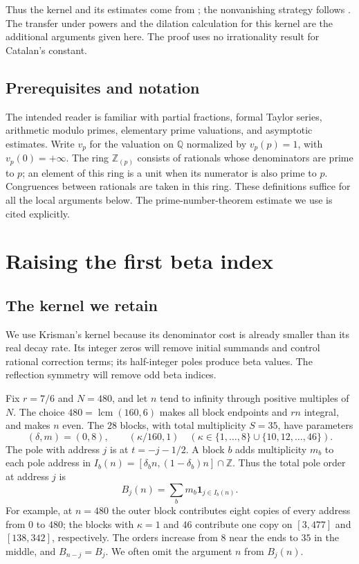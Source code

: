 \documentclass[11pt]{article}
\newcommand{\Z}{\mathbb Z}\newcommand{\Q}{\mathbb Q}
\newcommand{\ind}{\mathbf 1}
\begin{document}
Thus the kernel and its estimates come from \cite[Sections 2--6]{krisman};
the nonvanishing strategy follows \cite[Section 6]{shifted}. The transfer
under powers and the dilation calculation for this kernel are the
additional arguments given here. The proof uses no irrationality result
for Catalan's constant.

\subsection*{Prerequisites and notation}
The intended reader is familiar with partial fractions, formal Taylor
series, arithmetic modulo primes, elementary prime valuations, and
asymptotic estimates. Write
$v_p$ for the valuation on $\Q$ normalized by $v_p(p)=1$, with
$v_p(0)=+\infty$. The ring $\Z_{(p)}$ consists of rationals whose
denominators are prime to $p$; an element of this ring is a unit when its
numerator is also prime to $p$. Congruences between rationals are taken
in this ring. These definitions suffice for all the local arguments
below. The prime-number-theorem estimate we use is cited explicitly.

\section{Raising the first beta index}\label{sec:construction}
\subsection{The kernel we retain}
We use Krisman's kernel because its denominator cost is already smaller
than its real decay rate. Its integer zeros will remove initial summands
and control rational correction terms; its half-integer poles produce
beta values. The reflection symmetry will remove odd beta indices.

Fix $r=7/6$ and $N=480$, and let $n$ tend to infinity through positive
multiples of $N$. The choice $480=\operatorname{lcm}(160,6)$ makes all
block endpoints and $rn$ integral, and makes $n$ even. The $28$ blocks,
with total multiplicity $S=35$, have parameters
\[
 (\delta,m)=(0,8),\qquad (\kappa/160,1)
 \quad\left(\kappa\in\{1,\ldots,8\}\cup\{10,12,\ldots,46\}\right).
\]
The pole with address $j$ is at $t=-j-1/2$.
A block $b$ adds multiplicity $m_b$ to each pole address in
$I_b(n)=[\delta_b n,(1-\delta_b)n]\cap\Z$. Thus the total pole order at
address $j$ is
\[
 B_j(n)=\sum_bm_b\ind_{j\in I_b(n)}.
\]
For example, at $n=480$ the outer block contributes eight copies of every
address from $0$ to $480$; the blocks with $\kappa=1$ and $46$ contribute
one copy on $[3,477]$ and $[138,342]$, respectively. The orders increase
from $8$ near the ends to $35$ in the middle, and $B_{n-j}=B_j$.
We often omit the argument $n$ from $B_j(n)$.
\end{document}
